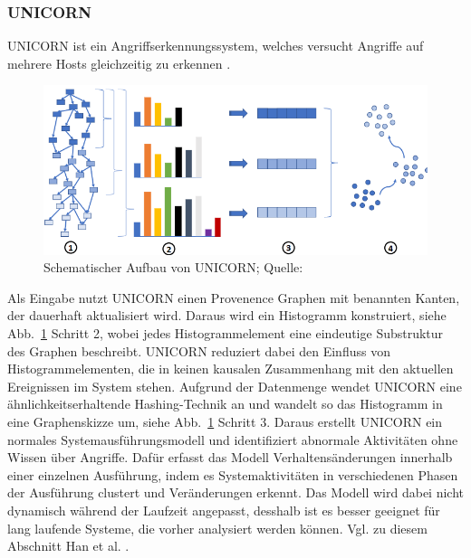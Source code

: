 \documentclass[conference]{IEEEtran}
\begin{document}
\subsubsection{UNICORN}
UNICORN ist ein Angriffserkennungssystem, welches versucht Angriffe auf mehrere Hosts gleichzeitig zu erkennen \cite{Han2020}.
\begin{figure}[htbp]
    \centerline{\includegraphics[scale=0.6]{figures/UNICORN.png}}
    \caption{Schematischer Aufbau von UNICORN; Quelle: \cite{Han2020}}
    \label{fig.unicorn}
\end{figure}
Als Eingabe nutzt UNICORN einen Provenence Graphen mit benannten Kanten, der dauerhaft aktualisiert wird.
Daraus wird ein Histogramm konstruiert, siehe Abb.~\ref{fig.unicorn} Schritt 2, wobei jedes Histogrammelement eine eindeutige Substruktur des Graphen beschreibt.
UNICORN reduziert dabei den Einfluss von Histogrammelementen, die in keinen kausalen Zusammenhang mit den aktuellen Ereignissen im System stehen.
Aufgrund der Datenmenge wendet UNICORN eine ähnlichkeitserhaltende Hashing-Technik an und wandelt so das Histogramm in eine Graphenskizze um, siehe Abb.~\ref{fig.unicorn} Schritt 3.
Daraus erstellt UNICORN ein normales Systemausführungsmodell und identifiziert abnormale Aktivitäten ohne Wissen über Angriffe.
Dafür erfasst das Modell Verhaltensänderungen innerhalb einer einzelnen Ausführung, indem es Systemaktivitäten in verschiedenen Phasen der Ausführung clustert und Veränderungen erkennt.
Das Modell wird dabei nicht dynamisch während der Laufzeit angepasst, desshalb ist es besser geeignet für lang laufende Systeme, die vorher analysiert werden können.
Vgl. zu diesem Abschnitt Han et al. \cite{Han2020}.
\end{document}
